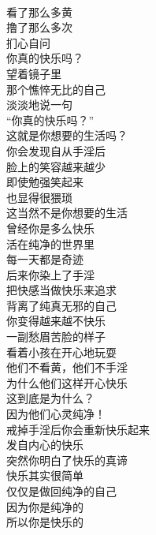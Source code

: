 \begin{poem}[手淫的你真的快乐吗？]
    \begin{multicols}{3}
        \begin{center}~\\
            看了那么多黄 \\ 撸了那么多次 \\ 扪心自问 \\ 你真的快乐吗？ \\ 望着镜子里 \\ 那个憔悴无比的自己 \\ 淡淡地说一句 \\ “你真的快乐吗？” \\ 这就是你想要的生活吗？ \\ 你会发现自从手淫后 \\ 脸上的笑容越来越少 \\ 即使勉强笑起来 \\ 也显得很猥琐 \\ 这当然不是你想要的生活 \\ 曾经你是多么快乐 \\ 活在纯净的世界里 \\ 每一天都是奇迹 \\ 后来你染上了手淫 \\ 把快感当做快乐来追求 \\ 背离了纯真无邪的自己 \\ 你变得越来越不快乐 \\ 一副愁眉苦脸的样子 \\ 看着小孩在开心地玩耍 \\ 他们不看黄，他们不手淫 \\ 为什么他们这样开心快乐 \\ 这到底是为什么？ \\ 因为他们心灵纯净！ \\ 戒掉手淫后你会重新快乐起来 \\ 发自内心的快乐 \\ 突然你明白了快乐的真谛 \\ 快乐其实很简单 \\ 仅仅是做回纯净的自己 \\ 因为你是纯净的 \\ 所以你是快乐的
        \end{center}
    \end{multicols}
\end{poem}

